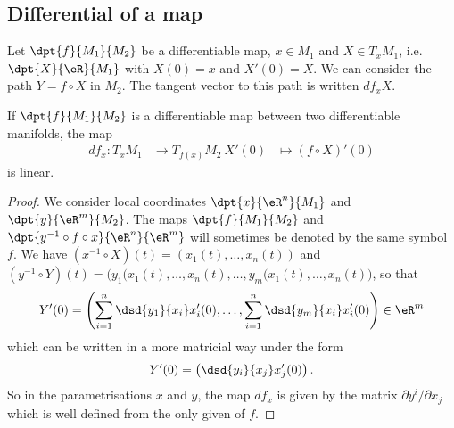 \subsection{Differential of a map}

Let $\dpt{f}{M_1}{M_2}$ be a differentiable map, $x\in M_1$ and $X\in T_xM_1$, i.e. $\dpt{X}{\eR}{M_1}$ with $X(0)=x$ and $X'(0)=X$. We can consider the path $Y=f\circ X$ in $M_2$. The tangent vector to this path is written $df_x X$.

\begin{proposition}
If $\dpt{f}{M_1}{M_2}$ is a differentiable map between two differentiable manifolds, the map
		\begin{equation}
		\begin{aligned}
			df_x \colon T_xM_1 &\to T_{f(x)}M_2\
			X'(0)&\mapsto (f\circ X)'(0)
		\end{aligned}
	\end{equation}
is linear.
\end{proposition}

\begin{proof}
We consider local coordinates $\dpt{x}{\eR^n}{M_1}$ and $\dpt{y}{\eR^m}{M_2}$. The maps $\dpt{f}{M_1}{M_2}$ and $\dpt{y^{-1}\circ f\circ x}{\eR^n}{\eR^m}$ will sometimes be denoted by the same symbol $f$. We have $(x^{-1}\circ X)(t)=(x_1(t),\ldots,x_n(t))$ and $(y^{-1}\circ Y)(t)=\big( y_1(x_1(t),\ldots,x_n(t),\ldots, y_m(x_1(t),\ldots,x_n(t)  \big)$, so that
\[
  Y'(0)=\left(   \sum_{i=1}^n \dsd{y_1}{x_i}x_i'(0),\ldots,\sum_{i=1}^n \dsd{y_m}{x_i}x_i'(0)   \right)\in\eR^m
\]
which can be written in a more matricial way under the form
\[
   Y'(0)=\left( \dsd{y_i}{x_j}x'_j(0) \right).
\]
So in the parametrisations $x$ and $y$, the map $df_x$ is given by the matrix $\partial y^i/\partial x_j$ which is well defined from the only given of $f$.
\end{proof}


